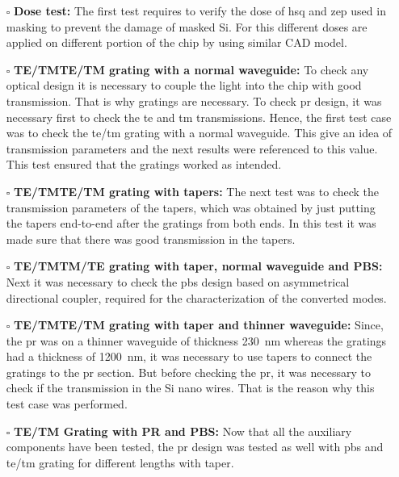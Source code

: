 \documentclass[../report.tex]{subfiles}
\begin{document}
	\begin{itemize}[leftmargin=*]
		\item[$\square$] \textbf{Dose test:} The first test requires to verify the dose of \gls{hsq} and \gls{zep} used in masking to prevent the damage of masked Si. For this different doses are applied on different portion of the chip by using similar CAD model.
		
		\item[$\square$] \textbf{TE/TM\textemdash TE/TM grating with a normal waveguide:} To check any optical design it is necessary to couple the light into the chip with good transmission. That is why gratings are necessary. To check \gls{pr} design, it was necessary first to check the \gls{te} and \gls{tm} transmissions. Hence, the first test case was to check the \gls{te}/\gls{tm} grating with a normal waveguide. This give an idea of transmission parameters and the next results were referenced to this value. This test ensured that the gratings worked as intended. 
		
		\item[$\square$] \textbf{TE/TM\textemdash TE/TM grating with tapers:} The next test was to check the transmission parameters of the tapers, which was obtained by just putting the tapers end-to-end after the gratings from both ends. In this test it was made sure that there was good transmission in the tapers.
		
		\item[$\square$] \textbf{TE/TM\textemdash TM/TE grating with taper, normal waveguide and PBS:} Next it was necessary to check the \gls{pbs} design based on asymmetrical directional coupler, required for the characterization of the converted modes.
		
		\item[$\square$] \textbf{TE/TM\textemdash TE/TM grating with taper and thinner waveguide:} Since, the \gls{pr} was on a thinner waveguide of thickness \SI{230}{\nano \meter} whereas the gratings had a thickness of \SI{1200}{\nano \meter}, it was necessary to use tapers to connect the gratings to the \gls{pr} section. But before checking the \gls{pr}, it was necessary to check if the transmission in the Si nano wires. That is the reason why this test case was performed. 
		
		\item[$\square$] \textbf{TE/TM Grating with PR and PBS:} Now that all the auxiliary components have been tested, the \gls{pr} design was tested as well with \gls{pbs} and \gls{te}/\gls{tm} grating for different lengths with taper.
		

\end{itemize}
\end{document}
